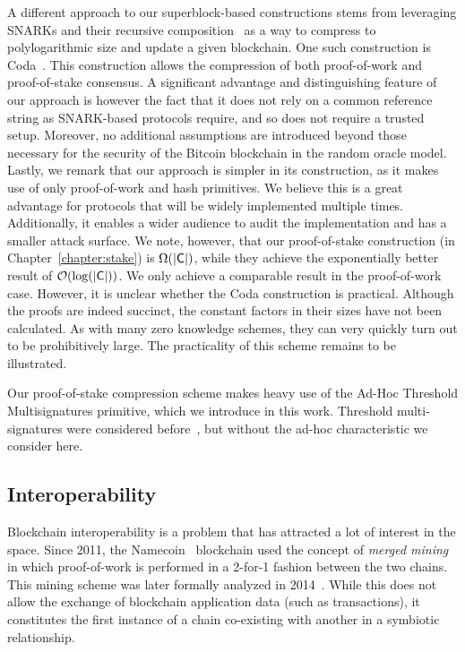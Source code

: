 A different approach to our superblock-based constructions stems from leveraging
SNARKs and their recursive composition~\cite{snarks,recursive-snarks} as a way
to compress to polylogarithmic size and update a given blockchain.
One such construction is Coda~\cite{coda}. This construction allows the
compression of both proof-of-work and proof-of-stake consensus. A significant
advantage and distinguishing feature of our approach is however the fact that it
does not rely on a common reference string as SNARK-based protocols require, and
so does not require a trusted setup. Moreover, no additional assumptions are
introduced beyond those necessary for the security of the Bitcoin blockchain in
the random oracle model. Lastly, we remark that our approach is simpler in its
construction, as it makes use of only proof-of-work and hash primitives. We
believe this is a great advantage for protocols that will be widely implemented
multiple times. Additionally, it enables a wider audience to audit the
implementation and has a smaller attack surface. We note, however, that our
proof-of-stake construction (in Chapter~\ref{chapter:stake}) is
$\Omega(|\mathsf{C}|)$, while they achieve the exponentially better result of
$\mathcal{O}(\log(|\mathsf{C}|))$. We only achieve a comparable result in the
proof-of-work case. However, it is unclear whether the Coda construction is
practical. Although the proofs are indeed succinct, the constant factors in
their sizes have not been calculated. As with many zero knowledge schemes, they
can very quickly turn out to be prohibitively large. The practicality of this
scheme remains to be illustrated.

Our proof-of-stake compression scheme makes heavy use of the Ad-Hoc Threshold
Multisignatures primitive, which we introduce in this work. Threshold
multi-signatures were considered before~\cite{pass-asynchronous}, but  without
the ad-hoc characteristic we consider here.

\subsection{Interoperability}
Blockchain interoperability is a problem that has attracted a lot of interest in
the space. Since 2011, the Namecoin~\cite{namecoin} blockchain used the concept
of \emph{merged mining} in which proof-of-work is performed in a 2-for-1 fashion
between the two chains. This mining scheme was later formally
analyzed in 2014~\cite{backbone}. While this does not allow the exchange of
blockchain application data (such as transactions), it constitutes the first
instance of a chain co-existing with another in a symbiotic relationship.

